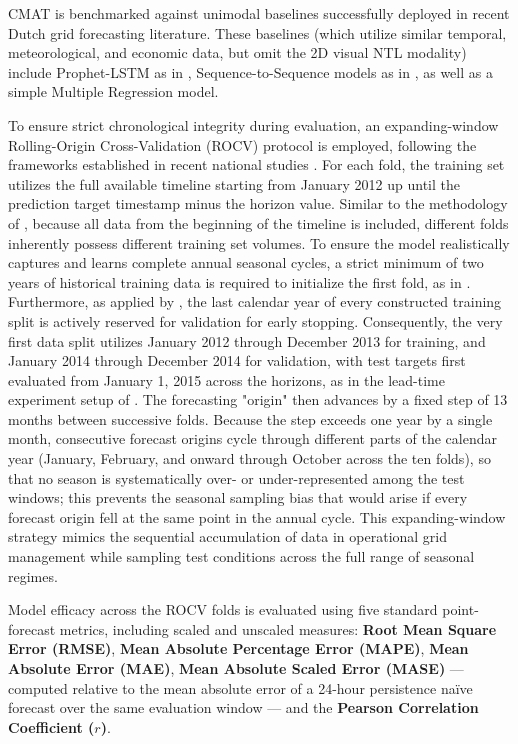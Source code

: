 CMAT is benchmarked against unimodal baselines successfully deployed in recent Dutch grid forecasting literature. These baselines (which utilize similar temporal, meteorological, and economic data, but omit the 2D visual NTL modality) include Prophet-LSTM as in \cite{van_de_sande_enhancing_2024}, Sequence-to-Sequence models as in \cite{ashtar_hybrid_2025}, as well as a simple Multiple Regression model.

To ensure strict chronological integrity during evaluation, an expanding-window Rolling-Origin Cross-Validation (ROCV) protocol is employed, following the frameworks established in recent national studies \cite{van_de_sande_enhancing_2024, curiel_integrating_2025}. For each fold, the training set utilizes the full available timeline starting from January 2012 up until the prediction target timestamp minus the horizon value. Similar to the methodology of \cite{curiel_integrating_2025,van_de_sande_enhancing_2024}, because all data from the beginning of the timeline is included, different folds inherently possess different training set volumes. To ensure the model realistically captures and learns complete annual seasonal cycles, a strict minimum of two years of historical training data is required to initialize the first fold, as in \cite{van_de_sande_enhancing_2024}. Furthermore, as applied by \cite{curiel_integrating_2025}, the last calendar year of every constructed training split is actively reserved for validation for early stopping. Consequently, the very first data split utilizes January 2012 through December 2013 for training, and January 2014 through December 2014 for validation, with test targets first evaluated from January 1, 2015 across the horizons, as in the lead-time experiment setup of \cite{van_de_sande_enhancing_2024}. The forecasting "origin" then advances by a fixed step of 13 months between successive folds. Because the step exceeds one year by a single month, consecutive forecast origins cycle through different parts of the calendar year (January, February, and onward through October across the ten folds), so that no season is systematically over- or under-represented among the test windows; this prevents the seasonal sampling bias that would arise if every forecast origin fell at the same point in the annual cycle. This expanding-window strategy mimics the sequential accumulation of data in operational grid management while sampling test conditions across the full range of seasonal regimes.

Model efficacy across the ROCV folds is evaluated using five standard point-forecast metrics, including scaled and unscaled measures: \textbf{Root Mean Square Error (RMSE)}, \textbf{Mean Absolute Percentage Error (MAPE)}, \textbf{Mean Absolute Error (MAE)}, \textbf{Mean Absolute Scaled Error (MASE)} --- computed relative to the mean absolute error of a 24-hour persistence na\"ive forecast over the same evaluation window --- and the \textbf{Pearson Correlation Coefficient ($r$)}.

